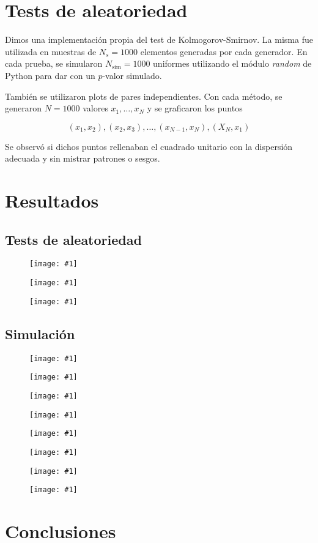 \documentclass[a4paper, 12pt]{article}
\newcommand{\insertimage}[1]{%
    \begin{figure}[hbtp!]
        \centering
        \texttt{[image: \#1]}
        \label{fig:#1}
    \end{figure}
}
\begin{document}
\section{Tests de aleatoriedad}

Dimos una implementación propia del test de Kolmogorov-Smirnov. La misma fue
utilizada en muestras de $N_s = 1000$ elementos generadas por cada generador. En
cada prueba, se simularon $N_{\text{sim}} = 1000$ uniformes utilizando el módulo
\textit{random} de Python para dar con un $p$-valor simulado. 

También se utilizaron plots de pares independientes. Con cada método, se
generaron $N = 1000$ valores $x_1, \ldots, x_N$ y se graficaron los puntos

$$(x_1, x_2), (x_2, x_3), \ldots, (x_{N-1}, x_N), (X_N, x_1)$$

Se observó si dichos puntos rellenaban el cuadrado unitario con la dispersión
adecuada y sin mistrar patrones o sesgos.

\section{Resultados}

\subsection{Tests de aleatoriedad}

\insertimage{Media/test_GCL.png}
\insertimage{Media/test_XORShift.png}
\insertimage{Media/test_PCG.png}

\FloatBarrier

\subsection{Simulación}

\insertimage{Media/tiempos_de_ejecucion.png}
\insertimage{Media/distrib_tiempos_espera.png}
\insertimage{Media/promedio_tiempo_en_sis.png}
\insertimage{Media/evolucion_cola_tiempo.png}
\insertimage{Media/histograma_tiempos_espera.png}
\insertimage{Media/distribucion_del_tiempo_e_histograma_tiempo_servicio.png}
\insertimage{Media/porcentaje_servidor_ocupado.png}
\insertimage{Media/tasa_utilizacion_servidor_tiempo.png}

\FloatBarrier

\section{Conclusiones}
\end{document}
